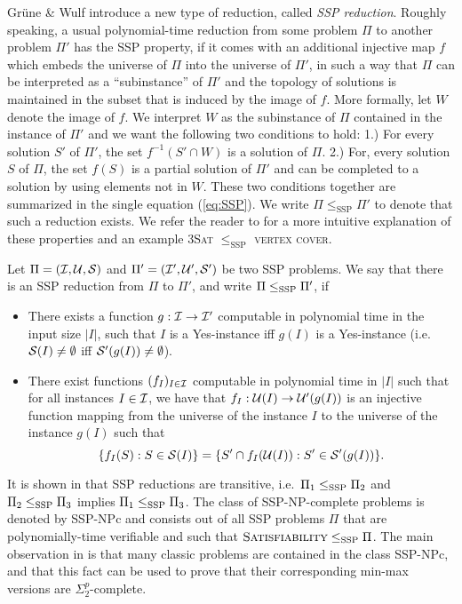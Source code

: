 Grüne \& Wulf introduce a new type of reduction, called \emph{SSP reduction}. 
Roughly speaking, a usual polynomial-time reduction from some problem $\Pi$ to another problem $\Pi'$ has the SSP property, 
if it comes with an additional injective map $f$ which embeds the universe of $\Pi$ into the universe of $\Pi'$, 
in such a way that $\Pi$ can be interpreted as a \enquote{subinstance} of $\Pi'$ and the topology of solutions is maintained in the subset that is induced by the image of $f$. 
More formally, let $W$ denote the image of $f$. We interpret $W$ as the subinstance of $\Pi$ contained in the instance of $\Pi'$ and we want the following two conditions to hold: 
1.) For every solution $S'$ of $\Pi'$, the set $f^{-1}(S' \cap W)$ is a solution of $\Pi$. 
2.) For, every solution $S$ of $\Pi$, the set $f(S)$ is a partial solution of $\Pi'$ and can be completed to a solution by using elements not in $W$.
These two conditions together are summarized in the single equation (\ref{eq:SSP}). We write $\Pi \leq_\text{SSP} \Pi'$ to denote that such a reduction exists.
We refer the reader to \cite{gruene2024completeness} for a more intuitive explanation of these properties and an example 3\textsc{Sat} $\leq_\text{SSP}$ \textsc{vertex cover}.

\begin{definition}
\label{def:ssp-reduction}
    Let $\Pi = (\mathcal{I},\mathcal{U},\mathcal{S})$ and $\Pi' = (\mathcal{I}',\mathcal{U}',\mathcal{S}')$ be two SSP problems. We say that there is an SSP reduction from $\Pi$ to $\Pi'$, and write $\Pi \leq_\text{SSP} \Pi'$, if
    \begin{itemize}
        \item There exists a function $g : \mathcal{I} \to \mathcal{I}'$ computable in polynomial time in the input size $|I|$, such that $I$ is a Yes-instance iff $g(I)$ is a Yes-instance (i.e. $\mathcal{S}(I) \neq \emptyset$ iff $\mathcal{S}'(g(I)) \neq \emptyset$).
        \item There exist functions $(f_I)_{I \in \mathcal{I}}$ computable in polynomial time in $|I|$ such that for all instances $I \in \mathcal{I}$, we have that $f_I : \mathcal{U}(I) \to \mathcal{U}'(g(I))$ is an injective function mapping from the universe of the instance $I$ to the universe of the instance $g(I)$ such that 
        \begin{equation}
            \{ f_I(S) : S \in \mathcal{S}(I)  \} = \{ S' \cap f_I(\mathcal{U}(I)) : S' \in  \mathcal{S}'(g(I)) \}. \label{eq:SSP}
        \end{equation}

    \end{itemize}
\end{definition}

It is shown in \cite{gruene2024completeness} that SSP reductions are transitive, i.e.\ $\Pi_1 \leq_\text{SSP} \Pi_2$ and $\Pi_2 \leq_\text{SSP} \Pi_3$ implies $\Pi_1 \leq_\text{SSP} \Pi_3$.
The class of SSP-NP-complete problems is denoted by SSP-NPc and consists out of all SSP problems $\Pi$ that are polynomially-time verifiable and such that $\textsc{Satisfiability} \leq_\text{SSP} \Pi$. 
The main observation in \cite{gruene2024completeness} is that many classic problems are contained in the class SSP-NPc, 
and that this fact can be used to prove that their corresponding min-max versions are $\Sigma^p_2$-complete. 
